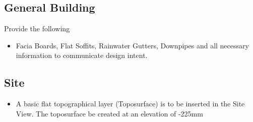 \subsection*{General Building}
Provide the following
\begin{itemize}
	\item Facia Boards, Flat Soffits, Rainwater Gutters, Downpipes and all necessary information to communicate design intent.
\end{itemize}


\subsection*{Site}
\begin{itemize}
	\item A basic flat topographical layer (Toposurface) is to be inserted in the Site View.  The toposurface be created at an elevation of -225mm
\end{itemize}


